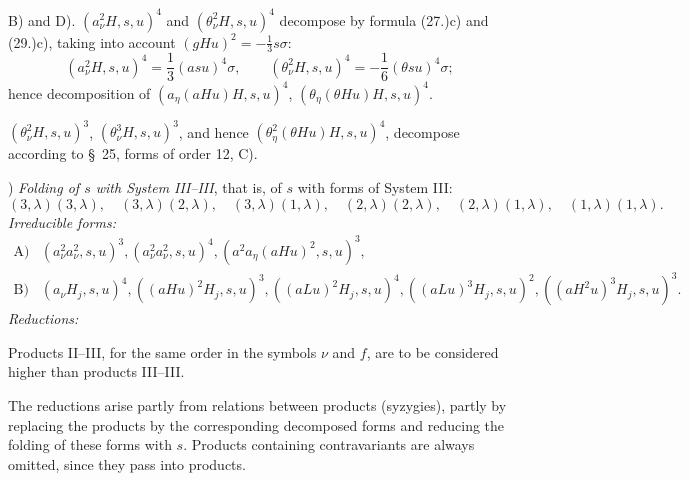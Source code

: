 \documentclass[11pt]{article}
\begin{document}
B) and D). $(a_\nu^2H,s,u)^4$ and $(\theta_\nu^2H,s,u)^4$ decompose by formula (27.)c) and (29.)c), taking into account $(gHu)^2=-\frac13s\sigma$:
\[
(a_\nu^2H,s,u)^4=\frac13(asu)^4\sigma,
\qquad
(\theta_\nu^2H,s,u)^4=-\frac16(\theta su)^4\sigma;
\]
hence decomposition of $(a_\eta(aHu)H,s,u)^4$, $(\theta_\eta(\theta Hu)H,s,u)^4$.

$(\theta_\nu^2H,s,u)^3$, $(\theta_\nu^3H,s,u)^3$, and hence $(\theta_\eta^2(\theta Hu)H,s,u)^4$, decompose according to \S\ 25, forms of order 12, C).

) \emph{Folding of $s$ with System III--III}, that is, of $s$ with forms of System III:
\[
(3,\lambda)(3,\lambda),\quad (3,\lambda)(2,\lambda),\quad (3,\lambda)(1,\lambda),\quad
(2,\lambda)(2,\lambda),\quad (2,\lambda)(1,\lambda),\quad (1,\lambda)(1,\lambda).
\]
\noindent\emph{Irreducible forms:}
\[
\begin{array}{rl}
\text{A)}&(a_\nu^2a_\nu^2,s,u)^3,
(a_\nu^2a_\nu^2,s,u)^4,
(a^2a_\eta(aHu)^2,s,u)^3,\\[0.3em]
\text{B)}&(a_\nu H_j,s,u)^4,
((aHu)^2H_j,s,u)^3,
((aLu)^2H_j,s,u)^4,
((aLu)^3H_j,s,u)^2,
((aH^2u)^3H_j,s,u)^3.
\end{array}
\]
\noindent\emph{Reductions:}

Products II--III, for the same order in the symbols $\nu$ and $f$, are to be considered higher than products III--III.

The reductions arise partly from relations between products (syzygies), partly by replacing the products by the corresponding decomposed forms and reducing the folding of these forms with $s$. Products containing contravariants are always omitted, since they pass into products.
\end{document}
